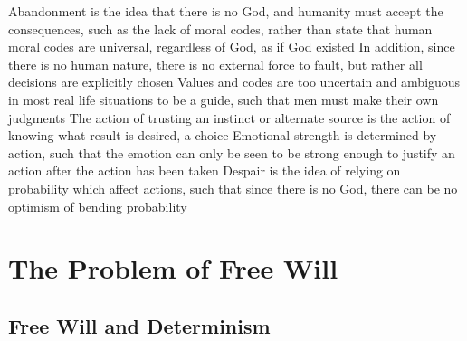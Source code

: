 \documentclass[11 pt, twoside]{article}
\newenvironment{outline*}
{
	\begin{outline}[enumerate]
	}
	{\end{outline}
}
\begin{document}
\begin{outline*}
\1 Abandonment is the idea that there is no God, and humanity must accept the consequences, such as the lack of moral codes, rather than state that human moral codes are universal, regardless of God, as if God existed
\2 In addition, since there is no human nature, there is no external force to fault, but rather all decisions are explicitly chosen
\2 Values and codes are too uncertain and ambiguous in most real life situations to be a guide, such that men must make their own judgments
\2 The action of trusting an instinct or alternate source is the action of knowing what result is desired, a choice
\2 Emotional strength is determined by action, such that the emotion can only be seen to be strong enough to justify an action after the action has been taken
\1 Despair is the idea of relying on probability which affect actions, such that since there is no God, there can be no optimism of bending probability
\2 
\end{outline*}
\section{The Problem of Free Will}
\subsection{Free Will and Determinism}
\begin{outline*}

\end{outline*}
\end{document}
